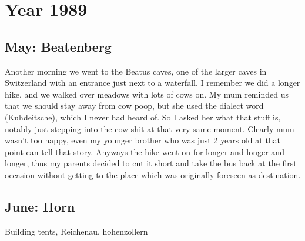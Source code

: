 \chapter{Year 1989}
\label{1989}



\section{May: Beatenberg}
\label{1989:Beatenberg}


Another morning we went to the Beatus caves, one of the larger caves in Switzerland with an entrance just next to a waterfall. I remember we did a longer hike, and we walked over meadows with lots of cows on. My mum reminded us that we should stay away from cow poop, but she used the dialect word (Kuhdeitsche), which I never had heard of. So I asked her what that stuff is, notably just stepping into the cow shit at that very same moment. Clearly mum wasn't too happy, even my younger brother who was just 2 years old at that point can tell that story. Anyways the hike went on for longer and longer and longer, thus my parents decided to cut it short and take the bus back at the first occasion without getting to the place which was originally foreseen as destination.

\section{June: Horn}
\label{1989:Horn}

Building tents, Reichenau, hohenzollern %

